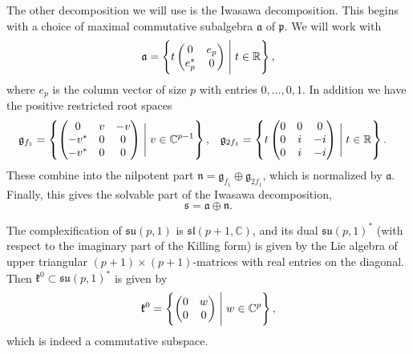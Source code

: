 \documentclass[a4paper,11pt]{amsart}
\newcommand{\R}{\mathbb R}
\newcommand{\C}{\mathbb C}
\newcommand{\fr}[1]{\mathfrak{#1}}
\theoremstyle{definition}
\theoremstyle{remark}
\begin{document}
The other decomposition we will use is the Iwasawa decomposition.
This begins with a choice of maximal commutative subalgebra $\fr{a}$ of $\fr{p}$.
We will work with
\[
\fr{a} = \left\{ t
\begin{pmatrix}
0 & e_p \\
e_p^* & 0
\end{pmatrix}
\Biggm| t\in\R \right\},
\]
where $e_p$ is the column vector of size $p$ with entries $0, \dots, 0, 1$.
In addition we have the positive restricted root spaces
\begin{align*}
\fr{g}_{f_1} &= \left\{
\begin{pmatrix}
0 & v & - v \\
- v^* & 0 & 0 \\
- v^* & 0 & 0 
\end{pmatrix}
\Biggm| v \in \C^{p-1} \right\} ,&
\fr{g}_{2f_1} &= \left\{ t
\begin{pmatrix}
0 & 0 & 0 \\
0 & i & -i \\
0 & i & -i \end{pmatrix}
\Biggm| t \in \R \right\} .
\end{align*}
These combine into the nilpotent part $\fr{n} = \fr{g}_{f_1} \oplus \fr{g}_{2f_1}$, which is normalized by $\fr{a}$.
Finally, this gives the solvable part of the Iwasawa decomposition,
\[
\fr{s} = \fr{a} \oplus \fr{n} .
\]

The complexification of $\fr{su}(p,1)$ is $\fr{sl}(p+1,\C)$, and its dual $\fr{su}(p,1)^*$ (with respect to the imaginary part of the Killing form) is given by the Lie algebra of upper triangular $(p+1)\times (p+1)$-matrices with real entries on the diagonal.
Then $\fr{k}^0  \subset \fr{su}(p,1)^*$ is given by
\[
\fr{k}^0 = \left\{ 
\begin{pmatrix}
0 & w \\ 0 & 0
\end{pmatrix}
\Biggm| w \in \C^p \right\},
\]
which is indeed a commutative subspace.
\end{document}
